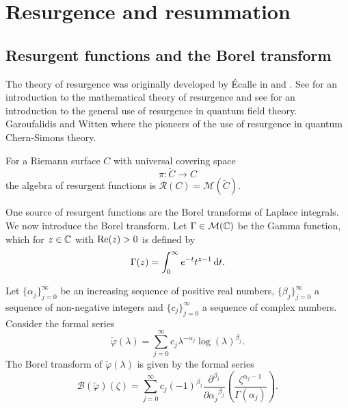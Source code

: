 
\section{Resurgence and resummation}  \label{sec:Borel}

\subsection{Resurgent functions and the Borel transform}

The theory of resurgence was originally developed by Écalle in \cite{Ecalle81a} and \cite{Ecalle81b}.  See \cite{MitschiSauzin16} for an introduction to the mathematical theory of resurgence and see \cite{DunneUnsal15} for an introduction to the general use of resurgence in quantum field theory. Garoufalidis \cite{Garoufalidis08} and Witten \cite{Witten11} where the pioneers of the use of resurgence in quantum Chern-Simons theory. \begin{definition} \label{def:res} For a Riemann surface $C$ with universal covering space 
	$$ \pi: \tilde{C}\rightarrow C$$ the algebra of resurgent functions is  $\mathcal{R}(C)=\mathcal{M}(\tilde{C}).$
\end{definition}

One source of resurgent functions are the Borel transforms of Laplace integrals. We now introduce the Borel transform. Let $\Gamma \in \mathcal{M}(\mathbb{C})$ be the Gamma function, which for $z \in \mathbb{C}$ with $\operatorname{Re}(z)>0$ is defined by
\begin{equation}
\Gamma(z)= \int_0^{\infty} e^{-t} t^{z-1} \operatorname{{d}\hskip-.6mm} t.
\end{equation}

\begin{definition} \label{def:Bor}  Let $\{\alpha_j \}_{j=0}^{\infty}$ be an increasing sequence of positive real numbers,  $\{\beta_j \}_{j=0}^{\infty}$ a sequence of non-negative integers and $\{c_j\}_{j=0}^{\infty}$ a sequence of complex numbers. Consider  the formal series $$\tilde{\varphi}(\lambda)=\sum_{j=0}^{\infty} c_j \lambda^{-\alpha_j} \log(\lambda)^{\beta_j}.$$ The Borel transform of $\tilde{\varphi}(\lambda)$ is given by the formal series
	\begin{equation} \label{def:Borel}
	\mathcal{B}(\tilde{\varphi})(\zeta) =\sum_{j=0}^{\infty} c_j (-1)^{\beta_j} \frac{\partial^{\beta_j}}{\partial {\alpha_j}^{\beta_j}} \left( \frac{\zeta^{\alpha_j-1}}{\Gamma(\alpha_j)}  \right).
	\end{equation}
\end{definition}

